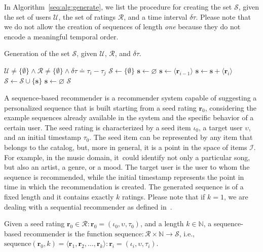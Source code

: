 In Algorithm~\ref{seq:alg:generate}, we list the procedure for creating the set $\mathcal{S}$, given the set of users $\mathcal{U}$, the set of ratings $\mathcal{R}$, and a time interval $\delta \tau$. Please note that we do not allow the creation of sequences of length \emph{one} because they do not encode a meaningful temporal order.

\begin{algorithm}
\caption{Generation of the set $\mathcal{S}$, given $\mathcal{U}$, $\mathcal{R}$, and $\delta \tau$.}
\label{seq:alg:generate}
\begin{algorithmic}[1]
\REQUIRE $\mathcal{U} \neq \{\emptyset\} \land \mathcal{R} \neq \{\emptyset\} \land \delta \tau \doteq \tau_i - \tau_j$
\STATE $\mathcal{S} \gets \{\emptyset\}$
\STATE $\mathbf s \gets \varnothing$
\STATE $\mathbf{s} \gets \langle \mathbf r_{i - 1} \rangle$
\ENDIF
\STATE $\mathbf{s} \gets \mathbf{s} + \langle \mathbf r_i \rangle$
\ELSE
{}
\STATE $\mathcal{S} \gets \mathcal{S} \cup \{\mathbf s\}$
\STATE $\mathbf{s} \gets \varnothing$
\ENDIF
\ENDIF
\ENDFOR
\ENDFOR
\RETURN $\mathcal{S}$
\end{algorithmic}
\end{algorithm}

A sequence-based recommender is a recommender system capable of suggesting a personalized sequence that is built starting from a seed rating $\mathbf{r}_0$, considering the example sequences already available in the system and the specific behavior of a certain user. The seed rating is characterized by a seed item $\iota_0$, a target user $\upsilon$, and an initial timestamp $\tau_0$. The seed item can be represented by any item that belongs to the catalog, but, more in general, it is a point in the space of items $\mathcal{I}$. For example, in the music domain, it~could identify not only a particular song, but also an artist, a genre, or a mood. The target user is the user to whom the sequence is recommended, while the initial timestamp represents the point in time in which the recommendation is created. The generated sequence is of a fixed length and it contains exactly $k$ ratings. Please note that if $k = 1$, we are dealing with a sequential recommender as defined in~\cite{Wang2015}.

\begin{definition}
Given a seed rating $\mathbf{r}_0 \in \mathcal{R} : \mathbf{r}_0 = (\iota_0, \upsilon, \tau_0)$, and a length $k \in \mathbb{N}$, a sequence-based recommender is the function $\mathrm{sequence} : \mathcal{R} \times \mathbb{N} \to \mathcal{S}$, i.e., $\mathrm{sequence}(\mathbf{r}_0, k) = \langle \mathbf{r}_1, \mathbf{r}_2, \dotsc, \mathbf{r}_k \rangle : \mathbf{r}_i = (\iota_i, \upsilon, \tau_i)$.
\end{definition}

